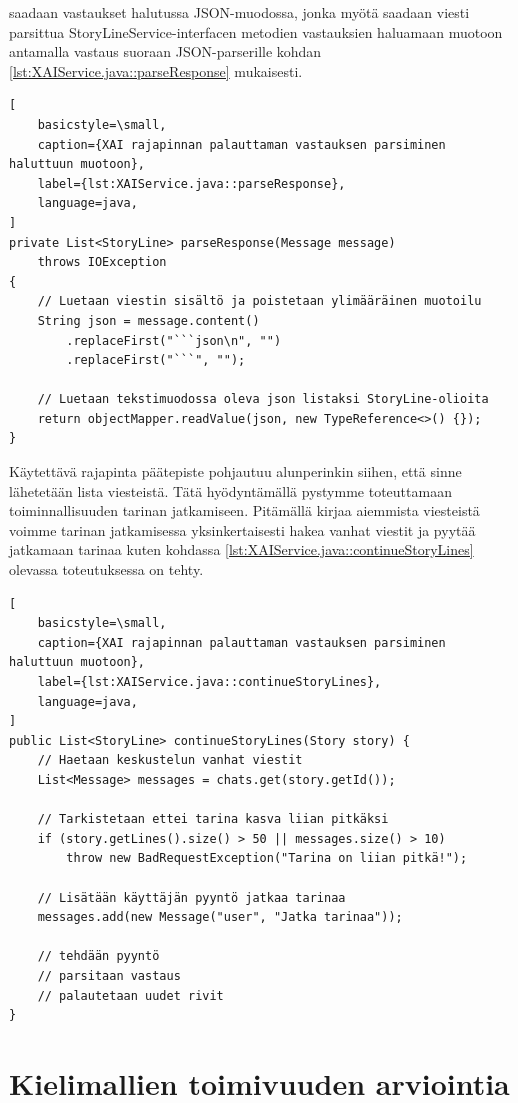 saadaan vastaukset halutussa JSON-muodossa, jonka myötä saadaan viesti
parsittua StoryLineService-interfacen metodien vastauksien haluamaan
muotoon antamalla vastaus suoraan JSON-parserille kohdan
\ref{lst:XAIService.java::parseResponse} mukaisesti.

\begin{lstlisting}[
    basicstyle=\small,
    caption={XAI rajapinnan palauttaman vastauksen parsiminen haluttuun muotoon},
    label={lst:XAIService.java::parseResponse},
    language=java,
]
private List<StoryLine> parseResponse(Message message)
    throws IOException
{
    // Luetaan viestin sisältö ja poistetaan ylimääräinen muotoilu
    String json = message.content()
        .replaceFirst("```json\n", "")
        .replaceFirst("```", "");

    // Luetaan tekstimuodossa oleva json listaksi StoryLine-olioita
    return objectMapper.readValue(json, new TypeReference<>() {});
}
\end{lstlisting}

Käytettävä rajapinta päätepiste pohjautuu alunperinkin siihen, että sinne
lähetetään lista viesteistä. Tätä hyödyntämällä pystymme toteuttamaan
toiminnallisuuden tarinan jatkamiseen. Pitämällä kirjaa aiemmista viesteistä
voimme tarinan jatkamisessa yksinkertaisesti hakea vanhat viestit ja pyytää
jatkamaan tarinaa kuten kohdassa \ref{lst:XAIService.java::continueStoryLines}
olevassa toteutuksessa on tehty.

\begin{lstlisting}[
    basicstyle=\small,
    caption={XAI rajapinnan palauttaman vastauksen parsiminen haluttuun muotoon},
    label={lst:XAIService.java::continueStoryLines},
    language=java,
]
public List<StoryLine> continueStoryLines(Story story) {
    // Haetaan keskustelun vanhat viestit
    List<Message> messages = chats.get(story.getId());

    // Tarkistetaan ettei tarina kasva liian pitkäksi
    if (story.getLines().size() > 50 || messages.size() > 10)
        throw new BadRequestException("Tarina on liian pitkä!");

    // Lisätään käyttäjän pyyntö jatkaa tarinaa
    messages.add(new Message("user", "Jatka tarinaa"));

    // tehdään pyyntö
    // parsitaan vastaus
    // palautetaan uudet rivit
}
\end{lstlisting}

\section{Kielimallien toimivuuden arviointia}
